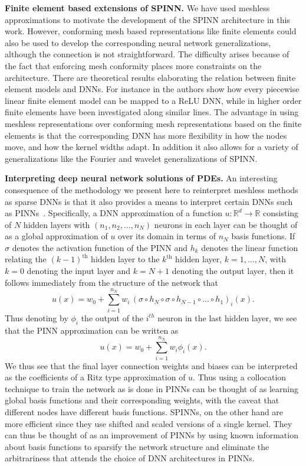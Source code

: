 \documentclass[12pt]{article}
\begin{document}
\textbf{Finite element based extensions of SPINN.} We have used meshless approximations to motivate the development of the SPINN architecture in this work. However, conforming mesh based representations like finite elements could also be used to develop the corresponding neural network generalizations, although the connection is not straightforward. The difficulty arises because of the fact that enforcing mesh conformity places more constraints on the architecture. There are theoretical results elaborating the relation between finite element models and DNNs. For instance in \cite{HLXZ2020} the authors show how every piecewise linear finite element model can be mapped to a ReLU DNN, while in \cite{OPS19} higher order finite elements have been investigated along similar lines.  The advantage in using meshless representations over conforming mesh representations based on the finite elements is that the corresponding DNN has more flexibility in how the nodes move, and how the kernel widths adapt. In addition it also allows for a variety of generalizations like the Fourier and wavelet generalizations of SPINN.

\textbf{Interpreting deep neural network solutions of PDEs.} An interesting consequence of the methodology we present here to reinterpret meshless methods as sparse DNNs is that it also provides a means to interpret certain DNNs such as PINNs~\cite{RPK2019}. Specifically, a DNN approximation of a function $u:\mathbb{R}^d \to \mathbb{R}$ consisting of $N$ hidden layers with $(n_1, n_2, \ldots, n_N)$ neurons in each layer can be thought of as a global approximation of $u$ over its domain in terms of $n_N$ basis functions. If $\sigma$ denotes the activation function of the PINN and $h_k$ denotes the linear function relating the $(k-1)^{\text{th}}$ hidden layer to the $k^{\text{th}}$ hidden layer, $k = 1, \ldots, N$, with $k = 0$ denoting the input layer and $k = N + 1$ denoting the output layer, then it follows immediately from the structure of the network that
\begin{displaymath}
u(x) = w_0 + \sum_{i=1}^{n_N} w_i \,(\sigma \circ h_{N} \circ \sigma \circ h_{N-1} \circ \ldots \circ h_1)_i(x).
\end{displaymath}
Thus denoting by $\phi_i$ the output of the $i^{th}$ neuron in the last hidden layer, we see that the PINN approximation can be written as
\begin{displaymath}
u(x) = w_0 + \sum_{i=1}^{n_N} w_i \phi_i(x).
\end{displaymath}
We thus see that the final layer connection weights and biases can be interpreted as the coefficients of a Ritz type approximation of $u$. Thus using a collocation technique to train the network as is done in PINNs can be thought of as learning global basis functions and their corresponding weights, with the caveat that different nodes have different basis functions. SPINNs, on the other hand are more efficient since they use shifted and scaled versions of a single kernel. They can thus be thought of as an improvement of PINNs by using known information about basis functions to sparsify the network structure and eliminate the arbitrariness that attends the choice of DNN architectures in PINNs.
\end{document}
